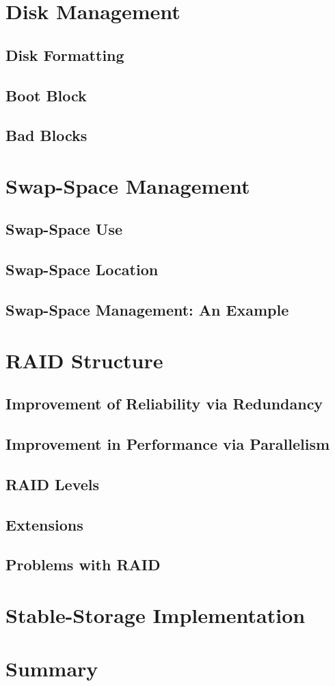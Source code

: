 \documentclass[12pt]{article}
\begin{document}
\section{Disk Management}
\subsection{Disk Formatting}
\subsection{Boot Block}
\subsection{Bad Blocks}
\section{Swap-Space Management}
\subsection{Swap-Space Use}
\subsection{Swap-Space Location}
\subsection{Swap-Space Management: An Example}
\section{RAID Structure}
\subsection{Improvement of Reliability via Redundancy}
\subsection{Improvement in Performance via Parallelism}
\subsection{RAID Levels}
\subsection{Extensions}
\subsection{Problems with RAID}
\section{Stable-Storage Implementation}
\section{Summary}
\end{document}
